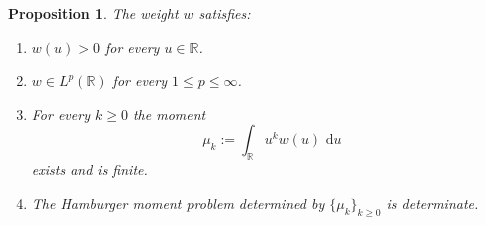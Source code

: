 \documentclass[11pt]{amsart}
\numberwithin{equation}{section}
\newtheorem{proposition}[theorem]{Proposition}
\theoremstyle{definition}
\newcommand{\R}{\mathbb{R}}
\newcommand{\dd}{\,\mathrm{d}}
\newcommand{\mom}[1]{\mu_{#1}}
\begin{document}
\begin{proposition}\label{prop:basic-weight}
The weight $w$ satisfies:
\begin{enumerate}
\item[(i)] $w(u)>0$ for every $u\in\R$.
\item[(ii)] $w\in L^{p}(\R)$ for every $1\le p\le\infty$.
\item[(iii)] For every $k\ge 0$ the moment
\begin{equation}\label{eq:moments}
\mom{k}:=\int_{\R}u^{k}w(u)\,\dd u
\end{equation}
exists and is finite.
\item[(iv)] The Hamburger moment problem determined by $\{\mom{k}\}_{k\ge 0}$
is determinate.
\end{enumerate}
\end{proposition}
\end{document}
